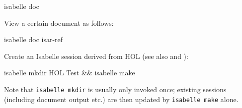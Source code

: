 \begin{isabellebody}
\begin{isamarkuptext}
\begin{ttbox}
  isabelle doc
\end{ttbox}

  View a certain document as follows:
\begin{ttbox}
  isabelle doc isar-ref
\end{ttbox}

  Create an Isabelle session derived from HOL (see also
   and ):
\begin{ttbox}
  isabelle mkdir HOL Test && isabelle make
\end{ttbox}
  Note that \verb|isabelle mkdir| is usually only invoked once;
  existing sessions (including document output etc.) are then updated
  by \verb|isabelle make| alone.%
\end{isamarkuptext}%
\isamarkuptrue%
%
\isadelimtheory
%
\endisadelimtheory
%
\isatagtheory
{}\isamarkupfalse%
%
\endisatagtheory
{\isafoldtheory}%
%
\isadelimtheory
%
\endisadelimtheory
\end{isabellebody}%
